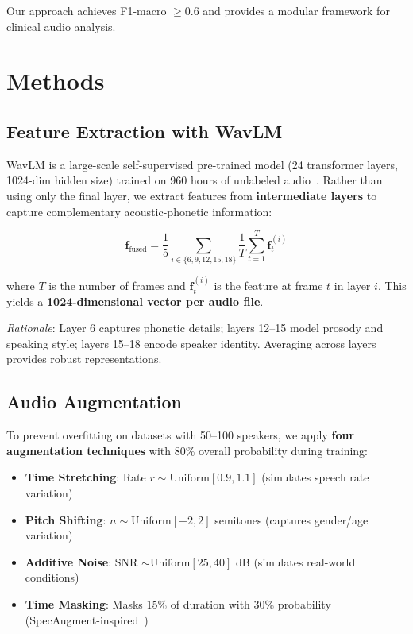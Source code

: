 \documentclass[conference]{IEEEtran}
\begin{document}
Our approach achieves F1-macro $\geq 0.6$ and provides a modular framework for clinical audio analysis.

\section{Methods}

\subsection{Feature Extraction with WavLM}

WavLM is a large-scale self-supervised pre-trained model (24 transformer layers, 1024-dim hidden size) trained on 960 hours of unlabeled audio~\cite{huang2021wavlm}. Rather than using only the final layer, we extract features from \textbf{intermediate layers} to capture complementary acoustic-phonetic information:

\begin{equation}
  \mathbf{f}_{\text{fused}} = \frac{1}{5} \sum_{i \in \{6,9,12,15,18\}} \frac{1}{T} \sum_{t=1}^{T} \mathbf{f}^{(i)}_t
\end{equation}

where $T$ is the number of frames and $\mathbf{f}^{(i)}_t$ is the feature at frame $t$ in layer $i$. This yields a \textbf{1024-dimensional vector per audio file}.

\textit{Rationale}: Layer 6 captures phonetic details; layers 12--15 model prosody and speaking style; layers 15--18 encode speaker identity. Averaging across layers provides robust representations.

\subsection{Audio Augmentation}

To prevent overfitting on datasets with 50--100 speakers, we apply \textbf{four augmentation techniques} with 80\% overall probability during training:

\begin{itemize}
  \item \textbf{Time Stretching}: Rate $r \sim \text{Uniform}[0.9, 1.1]$ (simulates speech rate variation)
  \item \textbf{Pitch Shifting}: $n \sim \text{Uniform}[-2, 2]$ semitones (captures gender/age variation)
  \item \textbf{Additive Noise}: SNR $\sim \text{Uniform}[25, 40]$ dB (simulates real-world conditions)
  \item \textbf{Time Masking}: Masks 15\% of duration with 30\% probability (SpecAugment-inspired~\cite{park2019specaugment})
\end{itemize}
\end{document}

